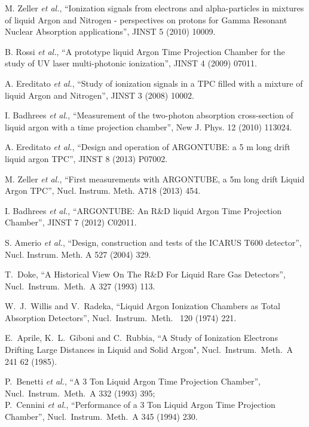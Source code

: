 \begin{thebibliography}{99}
M. Zeller {\it et al.}, ``Ionization signals from electrons and alpha-particles in mixtures of liquid Argon and Nitrogen - perspectives on protons for Gamma Resonant Nuclear 
Absorption applications'', JINST 5 (2010) 10009.

B. Rossi {\it et al.}, ``A prototype liquid Argon Time Projection Chamber for the study of UV laser multi-photonic ionization'', JINST 4 (2009) 07011.

A. Ereditato {\it et al.}, ``Study of ionization signals in a TPC filled with a mixture of liquid Argon and Nitrogen'', JINST 3 (2008) 10002.

I. Badhrees {\it et al.}, ``Measurement of the two-photon absorption cross-section of liquid argon with a time projection chamber'', New J. Phys. 12 (2010) 113024.

A. Ereditato {\it et al.}, ``Design and operation of ARGONTUBE: a 5 m long drift liquid argon TPC'', JINST 8 (2013) P07002.

M. Zeller {\it et al.}, ``First measurements with ARGONTUBE, a 5m long drift Liquid Argon TPC'', Nucl. Instrum. Meth. A718 (2013) 454.

I. Badhrees {\it et al.}, ``ARGONTUBE: An R\&D liquid Argon Time Projection Chamber'', JINST 7 (2012) C02011. 

S. Amerio {\it et al.}, ``Design, construction and tests of the ICARUS T600 detector'', Nucl. Instrum. Meth. A 527 (2004) 329.

T.~Doke,
``A Historical View On The R\&D For Liquid Rare Gas Detectors'',
Nucl.\ Instrum.\ Meth.\ A { 327} (1993) 113.

W.~J.~Willis and V.~Radeka,
``Liquid Argon Ionization Chambers as Total Absorption Detectors'',
Nucl.\ Instrum.\ Meth.\  { 120} (1974) 221.

E.~Aprile, K.~L.~Giboni and C.~Rubbia,
``A Study of Ionization Electrons Drifting Large Distances in Liquid and Solid
Argon",
Nucl.\ Instrum.\ Meth.\ A { 241} 62 (1985).

P.~Benetti {\it et al.},
``A 3 Ton Liquid Argon Time Projection Chamber'', 
Nucl.\ Instrum.\ Meth.\ A { 332} (1993) 395;\\

P.~Cennini {\it et al.},
``Performance of a 3 Ton Liquid Argon Time Projection Chamber'',  
Nucl.\ Instrum.\ Meth.\ A { 345} (1994) 230.


\end{thebibliography}
